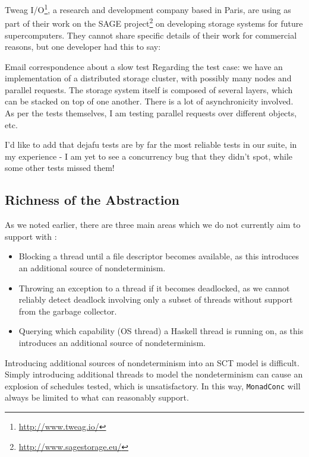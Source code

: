 Tweag I/O\footnote{\url{http://www.tweag.io/}}, a research and
development company based in Paris, are using \dejafu{} as part of
their work on the SAGE
project\footnote{\url{http://www.sagestorage.eu/}} on developing
storage systems for future supercomputers.  They cannot share specific
details of their work for commercial reasons, but one developer had
this to say:

\begin{bquote}{Email correspondence about a slow test}
  Regarding the test case: we have an implementation of a distributed
  storage cluster, with possibly many nodes and parallel requests.
  The storage system itself is composed of several layers, which can
  be stacked on top of one another.  There is a lot of asynchronicity
  involved.  As per the tests themselves, I am testing parallel
  requests over different objects, etc.

  I'd like to add that dejafu tests are by far the most reliable tests
  in our suite, in my experience - I am yet to see a concurrency bug
  that they didn't spot, while some other tests missed them!
\end{bquote}

\subsection{Richness of the Abstraction}

As we noted earlier, there are three main areas which we do not
currently aim to support with \dejafu{}:

\begin{itemize}
\item Blocking a thread until a file descriptor becomes available, as
  this introduces an additional source of nondeterminism.
\item Throwing an exception to a thread if it becomes deadlocked, as
  we cannot reliably detect deadlock involving only a subset of
  threads without support from the garbage collector.
\item Querying which capability (OS thread) a Haskell thread is
  running on, as this introduces an additional source of
  nondeterminism.
\end{itemize}

Introducing additional sources of nondeterminism into an SCT model is
difficult.  Simply introducing additional threads to model the
nondeterminism can cause an explosion of schedules tested, which is
unsatisfactory.  In this way, \verb|MonadConc| will always be limited
to what \dejafu{} can reasonably support.

